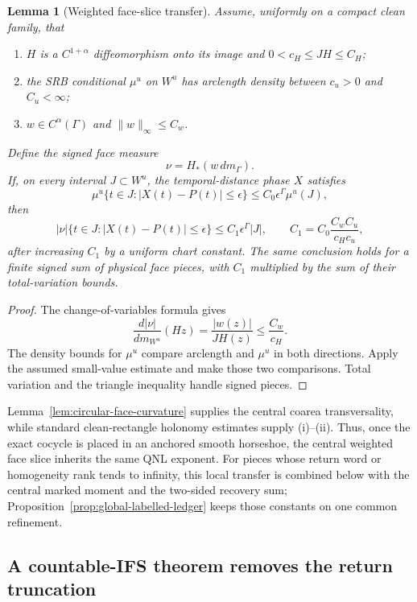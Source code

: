 \documentclass[11pt]{article}
\newtheorem{lemma}[theorem]{Lemma}
\begin{document}
\begin{lemma}[Weighted face-slice transfer]
\label{lem:weighted-face-qnl-transfer}
Assume, uniformly on a compact clean family, that
\begin{enumerate}[label=\textup{(\roman*)}]
\item $H$ is a $C^{1+\alpha}$ diffeomorphism onto its image and
      $0<c_H\le JH\le C_H$;
\item the SRB conditional $\mu^u$ on $W^u$ has arclength density between
      $c_u>0$ and $C_u<\infty$;
\item $w\in C^\alpha(\Gamma)$ and $\|w\|_\infty\le C_w$.
\end{enumerate}
Define the signed face measure
\[
 \nu=H_*(w\,dm_\Gamma).
\]
If, on every interval $J\subset W^u$, the temporal-distance phase $X$
satisfies
\[
 \mu^u\{t\in J:|X(t)-P(t)|\le\epsilon\}
 \le C_0\epsilon^\Gamma\mu^u(J),
\]
then
\[
 |\nu|\{t\in J:|X(t)-P(t)|\le\epsilon\}
 \le C_1\epsilon^\Gamma |J|,
 \qquad
 C_1=C_0\frac{C_wC_u}{c_Hc_u},
\]
after increasing $C_1$ by a uniform chart constant.  The same conclusion
holds for a finite signed sum of physical face pieces, with $C_1$ multiplied
by the sum of their total-variation bounds.
\end{lemma}

\begin{proof}
The change-of-variables formula gives
\[
 \frac{d|\nu|}{dm_{W^u}}(H z)
 =\frac{|w(z)|}{JH(z)}\le\frac{C_w}{c_H}.
\]
The density bounds for $\mu^u$ compare arclength and $\mu^u$ in both
directions.  Apply the assumed small-value estimate and make those two
comparisons.  Total variation and the triangle inequality handle signed
pieces.
\end{proof}

Lemma~\ref{lem:circular-face-curvature} supplies the central coarea
transversality, while standard clean-rectangle holonomy estimates supply
(i)--(ii).  Thus, once the exact cocycle is placed in an anchored smooth
horseshoe, the central weighted face slice inherits the same QNL exponent.
For pieces whose return word or homogeneity rank tends to infinity, this
local transfer is combined below with the central marked moment and the
two-sided recovery sum; Proposition~\ref{prop:global-labelled-ledger} keeps
those constants on one common refinement.

\subsection{A countable-IFS theorem removes the return truncation}
\label{subsec:countable-ifs}
\end{document}
